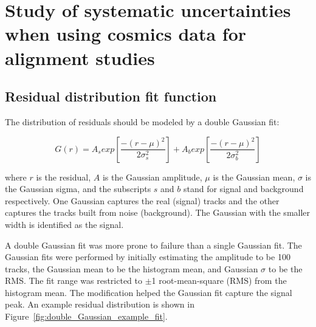 

\chapter[Analysis systematics]{Study of systematic uncertainties when using cosmics data for alignment studies}
\label{appendix:systematics}


\section{Residual distribution fit function}
\label{appendix:systematics_res_fit_fcn}


The distribution of residuals should be modeled by a double Gaussian fit\cite{lefebvre_thesis}:

\begin{equation}
\label{eqn:doub_gaus}
G(r) = A_{s}exp\left[ \frac{-(r-\mu)^{2}}{2\sigma_s^{2}} \right] + A_{b}exp\left[ \frac{-(r-\mu)^{2}}{2\sigma_b^{2}} \right]
\end{equation}

where $r$ is the residual, $A$ is the Gaussian amplitude, $\mu$ is the Gaussian mean, $\sigma$ is the Gaussian sigma, and the subscripts $s$ and $b$ stand for signal and background respectively. One Gaussian captures the real (signal) tracks and the other captures the tracks built from noise (background). The Gaussian with the smaller width is identified as the signal. 

A double Gaussian fit was more prone to failure than a single Gaussian fit. The Gaussian fits were performed by initially estimating the amplitude to be 100 tracks, the Gaussian mean to be the histogram mean, and Gaussian $\sigma$ to be the RMS. The fit range was restricted to $\pm$1 root-mean-square (RMS) from the histogram mean. The modification helped the Gaussian fit capture the signal peak. An example residual distribution is shown in Figure~\ref{fig:double_Gaussian_example_fit}. 

